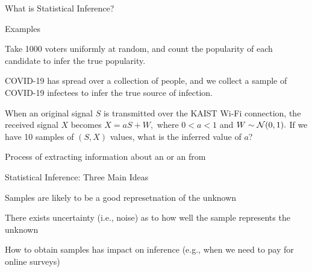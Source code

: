 


\begin{frame}{What is Statistical Inference?}

\plitemsep 0.07in
\bci

\item Examples
  
  \bci

\item<2-> Take 1000 voters uniformly at random, and count the popularity
  of each candidate to infer the true popularity.

\item<3-> COVID-19 has spread over a collection of people, and we collect a sample of COVID-19
  infectees to infer the true source of infection. 

\item<4-> When an original signal $S$ is transmitted over the KAIST Wi-Fi
  connection, the received signal $X$ becomes $X = aS + W,$ where $ 0 <
  a < 1  $ and $W \sim \mathcal N(0,1).$ If we have 10 samples of $(S,X)$
  values, what is the inferred value of $a$?

  \eci

\item<5-> Process of extracting information about an  or
  an  from 


  \eci

\end{frame}

\begin{frame}{Statistical Inference: Three Main Ideas}

\plitemsep 0.2in
\bce

\item<2-> Samples are likely to be a good represetnation of the unknown

\item<3-> There exists uncertainty (i.e., noise) as to how well the sample
  represents the unknown

\item<4-> How to obtain samples has impact on inference (e.g., when we
  need to pay for online surveys)
  
  \ece

\end{frame}


